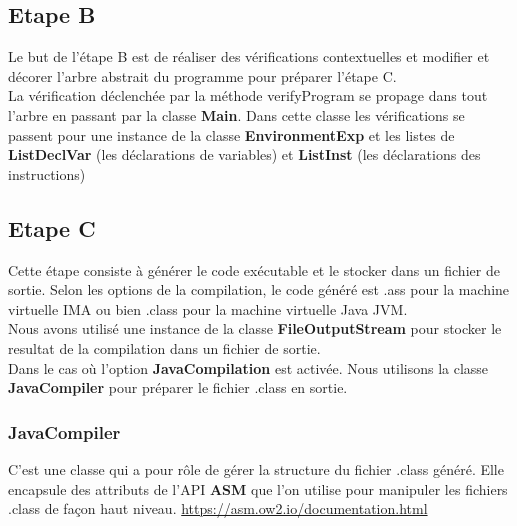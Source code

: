 \documentclass[12pt, a4paper, one side]{article}
\begin{document}
    \subsection{Etape B}
    Le but de l'étape B est de réaliser des vérifications contextuelles et modifier et décorer l'arbre abstrait du programme pour préparer l'étape C.
    \\
    La vérification déclenchée par la méthode verifyProgram se propage dans tout l'arbre en passant par la classe \textbf{Main}. Dans cette classe les vérifications se passent pour une instance de la classe \textbf{EnvironmentExp} et les listes de \textbf{ListDeclVar} (les déclarations de variables) et \textbf{ListInst} (les déclarations des instructions)

    \subsection{Etape C}
    Cette étape consiste à générer le code exécutable et le stocker dans un fichier de sortie. Selon les options de la compilation, le code généré est .ass pour la machine virtuelle IMA ou bien .class pour la machine virtuelle Java JVM.
    \\
    Nous avons utilisé une instance de la classe \textbf{FileOutputStream} pour stocker le resultat de la compilation dans un fichier de sortie.\\
    Dans le cas où l'option \textbf{JavaCompilation} est activée. Nous utilisons la classe \textbf{JavaCompiler} pour préparer le fichier .class en sortie.

    \subsubsection{JavaCompiler}
    C'est une classe qui a pour rôle de gérer la structure du fichier .class généré. Elle encapsule des attributs de l'API \textbf{ASM} que l'on utilise pour manipuler les fichiers .class de façon haut niveau. \url{https://asm.ow2.io/documentation.html}
\end{document}
